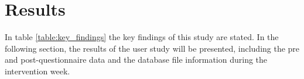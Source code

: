 \documentclass{hasel_thesis}
\begin{document}

\chapter{Results} \label{results}

In table \ref{table:key_findings} the key findings of this study are stated. In the following section, the results of the user study will be presented, including the pre and post-questionnaire data and the database file information during the intervention week.
\end{document}
